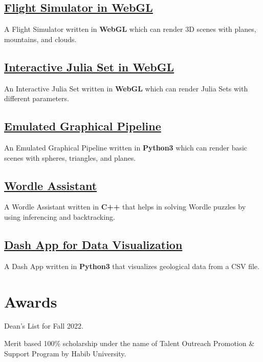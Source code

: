 \documentclass[]{resume}
\begin{document}
\begin{minipage}[t]{0.5\textwidth}
    \subsection{\href{https://github.com/Qazalbash/Flight-Simulator-in-WebGL}{\textbf{Flight Simulator in WebGL}}}
    A Flight Simulator written in \textbf{WebGL} which can render 3D scenes with planes, mountains, and clouds.

    \subsection{\href{https://github.com/Qazalbash/Interactive-Julia-Set}{\textbf{Interactive Julia Set in WebGL}}}
    An Interactive Julia Set written in \textbf{WebGL} which can render Julia Sets with different parameters.

    \subsection{\href{https://github.com/Qazalbash/Emulated-Graphical-Pipeline}{
            \textbf{Emulated Graphical Pipeline}}}%
    An Emulated Graphical Pipeline written in \textbf{Python3} which can render basic scenes with spheres, triangles, and planes.

    \subsection{\href{https://github.com/Qazalbash/Wordle-Assistant}{\textbf{Wordle Assistant}}}%
    A Wordle Assistant written in \textbf{C++} that helps in solving Wordle puzzles by using inferencing and backtracking.

    \subsection{\href{https://github.com/Qazalbash/Dash-App-for-Data-Visualization}{
            \textbf{Dash App for Data Visualization}}}%
    A Dash App written in \textbf{Python3} that visualizes geological data from a CSV file.

    \section{Awards}
    \sectionsep
    \begin{tightemize}
        \item Dean's List for Fall 2022.
        \item Merit based 100\% scholarship under the name of Talent Outreach Promotion \& Support Program by Habib University.
    \end{tightemize}


\end{minipage}
\end{document}
